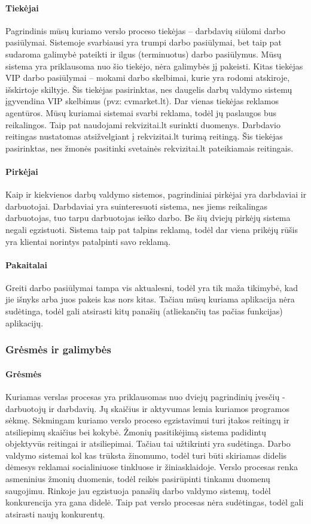 \documentclass{VUMIFPSkursinis}
\begin{document}
\paragraph{Tiekėjai}
Pagrindinis mūsų kuriamo verslo proceso tiekėjas – darbdavių siūlomi darbo pasiūlymai. Sistemoje svarbiausi yra trumpi darbo pasiūlymai, bet taip pat sudaroma galimybė pateikti ir ilgus (terminuotus) darbo pasiūlymus. Mūsų sistema yra priklausoma nuo šio tiekėjo, nėra galimybės jį pakeisti. Kitas tiekėjas VIP darbo pasiūlymai – mokami darbo skelbimai, kurie yra rodomi atskiroje, išskirtoje skiltyje. Šis tiekėjas pasirinktas, nes daugelis darbų valdymo sistemų įgyvendina VIP skelbimus (pvz: cvmarket.lt). Dar vienas tiekėjas reklamos agentūros. Mūsų kuriamai sistemai svarbi reklama, todėl jų paslaugos bus reikalingos. Taip pat naudojami rekvizitai.lt surinkti duomenys. Darbdavio reitingas nustatomas atsižvelgiant į rekvizitai.lt turimą reitingą. Šis tiekėjas pasirinktas, nes žmonės pasitinki svetainės rekvizitai.lt pateikiamais reitingais.
\paragraph{Pirkėjai}
Kaip ir kiekvienos darbų valdymo sistemos, pagrindiniai pirkėjai yra darbdaviai ir darbuotojai. Darbdaviai yra suinteresuoti sistema, nes jiems reikalingas darbuotojas, tuo tarpu darbuotojas ieško darbo. Be šių dviejų pirkėjų sistema negali egzistuoti. Sistema taip pat talpins reklamą, todėl dar viena prikėjų rūšis yra klientai norintys patalpinti savo reklamą.
\paragraph{Pakaitalai}Greiti darbo pasiūlymai tampa vis aktualesni, todėl yra tik maža tikimybė, kad jie išnyks arba juos pakeis kas nors kitas. Tačiau mūsų kuriama aplikacija nėra sudėtinga, todėl gali atsirasti kitų panašių (atliekančių tas pačias funkcijas) aplikacijų.

\subsubsection{Grėsmės ir galimybės}

\paragraph{Grėsmės}
Kuriamas verslas procesas yra priklausomas nuo dviejų pagrindinių įvesčių - darbuotojų ir darbdavių. Jų skaičius ir aktyvumas lemia kuriamos programos sėkmę. Sėkmingam kuriamo verslo proceso egzistavimui turi įtakos reitingų ir atsiliepimų skaičius bei kokybė. Žmonių pasitikėjimą sistema padidintų objektyvūs reitingai ir atsiliepimai. Tačiau tai užtikrinti yra sudėtinga. Darbo valdymo sistemai kol kas trūksta žinomumo, todėl turi būti skiriamas didelis dėmesys reklamai socialiniuose tinkluose ir žiniasklaidoje. Verslo procesas renka asmeninius žmonių duomenis, todėl reikės pasirūpinti tinkamu duomenų saugojimu. Rinkoje jau egzistuoja panašių darbo valdymo sistemų, todėl konkurencija yra gana didelė. Taip pat verslo procesas nėra sudėtingas, todėl gali atsirasti naujų konkurentų.
\end{document}
